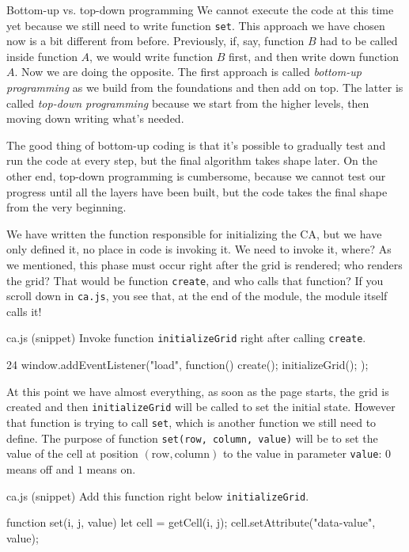 \begin{important}{Bottom-up vs. top-down programming}
We cannot execute the code at this time yet because we still need to write function \texttt{set}.
This approach we have chosen now is a bit different from before. Previously, if, say, function $B$ had to
be called inside function $A$, we would write function $B$ first, and then write down function $A$. Now we are
doing the opposite. The first approach is called \textit{bottom-up programming}
as we build from the foundations and then add on top.
The latter is called \textit{top-down programming} because we start from the higher levels, then moving down
writing what's needed.

The good thing of bottom-up coding is that it's possible to gradually test and run the code at 
every step, but the final algorithm takes
shape later. On the other end, top-down programming is cumbersome, because we cannot test our progress until
all the layers have been built, but the code takes the final shape from the very beginning.
\end{important}

We have written the function responsible for initializing the CA, but we have only defined it, no place in code
is invoking it. We need to invoke it, where? As we mentioned, this phase must occur right after the grid is
rendered; who renders the grid? That would be function \texttt{create}, and who calls that function? If you
scroll down in \texttt{ca.js}, you see that, at the end of the module, the module itself calls it!

\begin{programcode}{ca.js (snippet)}
Invoke function \texttt{initializeGrid} right after calling \texttt{create}.
\begin{codeh1}{2}{4}
window.addEventListener("load", function(){
  create();
  initializeGrid();
});
\end{codeh1}
\end{programcode}

At this point we have almost everything, as soon as the page starts, the grid is created and then
\texttt{initializeGrid} will be called to set the initial state. However that function is trying to
call \texttt{set}, which is another function we still need to define. The purpose of function
\texttt{set(row, column, value)} will be to set the value of the cell at position
$(\text{row}, \text{column})$ to the value in parameter \texttt{value}: $0$ means off and $1$ means on.

\begin{programcode}{ca.js (snippet)}
Add this function right below \texttt{initializeGrid}.
\begin{code}
function set(i, j, value) {
  let cell = getCell(i, j);
  cell.setAttribute("data-value", value);
}
\end{code}
\end{programcode}

